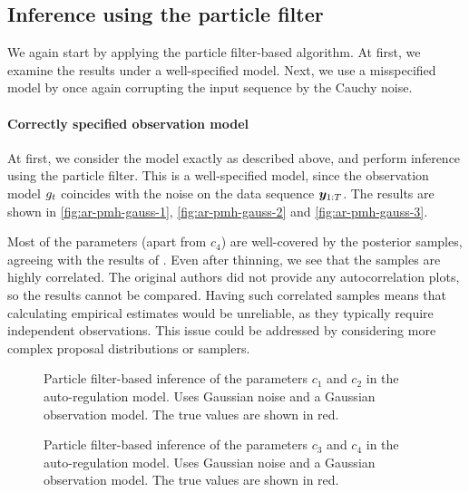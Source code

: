 \subsection{Inference using the particle filter}
We again start by applying the particle filter-based algorithm. At first, we examine the results under a well-specified model. Next, we use a misspecified model by once again corrupting the input sequence by the Cauchy noise.

\paragraph{Correctly specified observation model}
At first, we consider the model exactly as described above, and perform inference using the particle filter. This is a well-specified model, since the observation model $g_t$ coincides with the noise on the data sequence $\bm{y}_{1:T}$. The results are shown in \autoref{fig:ar-pmh-gauss-1}, \autoref{fig:ar-pmh-gauss-2} and \autoref{fig:ar-pmh-gauss-3}.

Most of the parameters (apart from $c_4$) are well-covered by the posterior samples, agreeing with the results of \cite{wilkinson}. Even after thinning, we see that the samples are highly correlated. The original authors did not provide any autocorrelation plots, so the results cannot be compared. Having such correlated samples means that calculating empirical estimates would be unreliable, as they typically require independent observations. This issue could be addressed by considering more complex proposal distributions or samplers.

\begin{figure}[htp]%
    \centering
    \qquad
    \caption{Particle filter-based inference of the parameters $c_1$ and $c_2$ in the auto-regulation model. Uses Gaussian noise and a Gaussian observation model. The true values are shown in red.}%
    \label{fig:ar-pmh-gauss-1}%
\end{figure}

\begin{figure}[htp]%
    \centering
    \qquad
    \caption{Particle filter-based inference of the parameters $c_3$ and $c_4$ in the auto-regulation model. Uses Gaussian noise and a Gaussian observation model. The true values are shown in red.}%
    \label{fig:ar-pmh-gauss-2}%
\end{figure}

